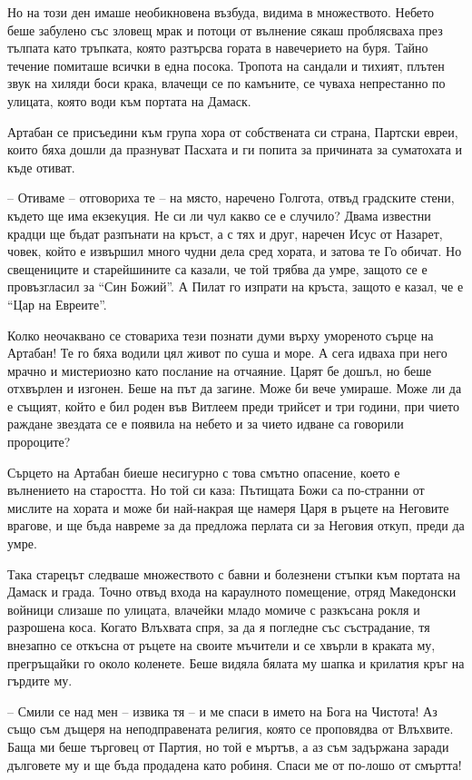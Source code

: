 Но на този ден имаше необикновена възбуда, видима в множеството. Небето беше
забулено със зловещ мрак и потоци от вълнение сякаш проблясваха през тълпата
като тръпката, която разтърсва гората в навечерието на буря. Тайно течение
помиташе всички в една посока. Тропота на сандали и тихият, плътен звук на
хиляди боси крака, влачещи се по камъните, се чуваха непрестанно по улицата,
която води към портата на Дамаск.

Артабан се присъедини към група хора от собствената си страна, Партски евреи,
които бяха дошли да празнуват Пасхата и ги попита за причината за суматохата и
къде отиват.

-- Отиваме -- отговориха те -- на място, наречено Голгота, отвъд градските
стени, където ще има екзекуция. Не си ли чул какво се е случило? Двама известни
крадци ще бъдат разпънати на кръст, а с тях и друг, наречен Исус от Назарет,
човек, който е извършил много чудни дела сред хората, и затова те Го обичат. Но
свещениците и старейшините са казали, че той трябва да умре, защото се е
провъзгласил за ``Син Божий''. А Пилат го изпрати на кръста, защото е казал, че
е ``Цар на Евреите''.

Колко неочаквано се стовариха тези познати думи върху умореното сърце на
Артабан! Те го бяха водили цял живот по суша и море. А сега идваха при него
мрачно и мистериозно като послание на отчаяние. Царят бе дошъл, но беше
отхвърлен и изгонен. Беше на път да загине. Може би вече умираше. Може ли да е
същият, който е бил роден във Витлеем преди трийсет и три години, при чието
раждане звездата се е появила на небето и за чието идване са говорили пророците?

Сърцето на Артабан биеше несигурно с това смътно опасение, което
е вълнението на старостта. Но той си каза: Пътищата Божи са по-странни от
мислите на хората и може би най-накрая ще намеря Царя в ръцете на Неговите
врагове, и ще бъда навреме за да предложа перлата си за Неговия откуп, преди да
умре.

Така старецът следваше множеството с бавни и болезнени стъпки към портата на
Дамаск и града. Точно отвъд входа на караулното помещение, отряд Македонски
войници слизаше по улицата, влачейки младо момиче с разкъсана рокля и разрошена
коса. Когато Влъхвата спря, за да я погледне със състрадание, тя внезапно се
откъсна от ръцете на своите мъчители и се хвърли в краката му, прегръщайки го
около коленете. Беше видяла бялата му шапка и крилатия кръг на гърдите му.

-- Смили се над мен -- извика тя -- и ме спаси в името на Бога на Чистота! Аз
също съм дъщеря на неподправената религия, която се проповядва от Влъхвите. Баща
ми беше търговец от Партия, но той е мъртъв, а аз съм задържана заради дълговете
му и ще бъда продадена като робиня. Спаси ме от по-лошо от смъртта!


